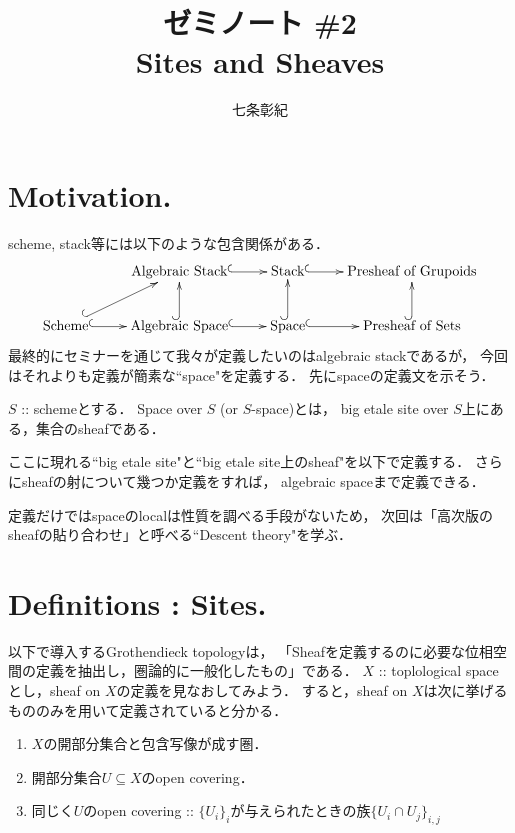 \documentclass[a4paper]{jsarticle}
\begin{document}
\title{ゼミノート \#2 \\ Sites and Sheaves}
\author{七条彰紀}
\maketitle

\section{Motivation.}
scheme, stack等には以下のような包含関係がある．
\[\xymatrix{
    {} & \text{Algebraic Stack} \ar@{^{(}->}[r]& \text{Stack} \ar@{^{(}->}[r]& \text{Presheaf of Grupoids} \\
    \text{Scheme} \ar@{^{(}->}[r]\ar@{^{(}->}[ru]& \text{Algebraic Space} \ar@{^{(}->}[r]\ar@{^{(}->}[u]&
        \text{Space} \ar@{^{(}->}[r]\ar@{^{(}->}[u]& \text{Presheaf of Sets} \ar@{^{(}->}[u]
}\]
最終的にセミナーを通じて我々が定義したいのはalgebraic stackであるが，
今回はそれよりも定義が簡素な``space"を定義する．
先にspaceの定義文を示そう．

\begin{Def}
    $S$ :: schemeとする．
    Space over $S$ (or $S$-space)とは，
    big etale site over $S$上にある，集合のsheafである．
\end{Def}
ここに現れる``big etale site"と``big etale site上のsheaf"を以下で定義する．
さらにsheafの射について幾つか定義をすれば，
algebraic spaceまで定義できる．

定義だけではspaceのlocalは性質を調べる手段がないため，
次回は「高次版のsheafの貼り合わせ」と呼べる``Descent theory"を学ぶ．

\section{Definitions : Sites.}
以下で導入するGrothendieck topologyは，
「Sheafを定義するのに必要な位相空間の定義を抽出し，圏論的に一般化したもの」である．
$X$ :: toplological spaceとし，sheaf on $X$の定義を見なおしてみよう．
すると，sheaf on  $X$は次に挙げるもののみを用いて定義されていると分かる．
\begin{enumerate}
    \item $X$の開部分集合と包含写像が成す圏．
    \item 開部分集合$U \subseteq X$のopen covering．
    \item 同じく$U$のopen covering :: $\{U_i\}_i$が与えられたときの族$\{ U_i \cap U_j \}_{i,j}$
\end{enumerate}
\end{document}
